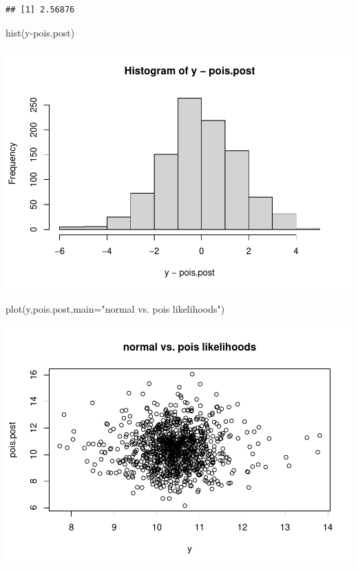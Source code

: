 \documentclass[
]{book}
\newenvironment{Shaded}{\begin{snugshade}}{\end{snugshade}}
\newcommand{\AttributeTok}[1]{\textcolor[rgb]{0.77,0.63,0.00}{#1}}
\newcommand{\FunctionTok}[1]{\textcolor[rgb]{0.00,0.00,0.00}{#1}}
\newcommand{\NormalTok}[1]{#1}
\newcommand{\SpecialCharTok}[1]{\textcolor[rgb]{0.00,0.00,0.00}{#1}}
\newcommand{\StringTok}[1]{\textcolor[rgb]{0.31,0.60,0.02}{#1}}
\theoremstyle{definition}
\theoremstyle{definition}
\theoremstyle{definition}
\theoremstyle{definition}
\theoremstyle{remark}
\begin{document}
\begin{verbatim}
## [1] 2.56876
\end{verbatim}

\begin{Shaded}
\begin{Highlighting}[]
 \FunctionTok{hist}\NormalTok{(y}\SpecialCharTok{{-}}\NormalTok{pois.post)}
\end{Highlighting}
\end{Shaded}

\includegraphics{_main_files/figure-latex/unnamed-chunk-41-1.pdf}

\begin{Shaded}
\begin{Highlighting}[]
 \FunctionTok{plot}\NormalTok{(y,pois.post,}\AttributeTok{main=}\StringTok{"normal vs. pois likelihoods"}\NormalTok{)}
\end{Highlighting}
\end{Shaded}

\includegraphics{_main_files/figure-latex/unnamed-chunk-41-2.pdf}
\end{document}
